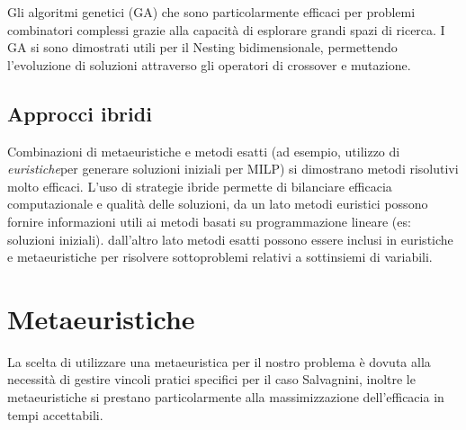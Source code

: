 Gli algoritmi genetici (GA) che sono particolarmente efficaci per problemi combinatori complessi grazie alla capacità di esplorare grandi spazi di ricerca. I GA si sono dimostrati utili per il Nesting bidimensionale, permettendo l'evoluzione di soluzioni attraverso gli operatori di crossover e mutazione.


\subsection{Approcci ibridi}

Combinazioni di metaeuristiche e metodi esatti (ad esempio, utilizzo di \emph{euristiche}\glsfirstoccur per generare soluzioni iniziali per MILP) si dimostrano metodi risolutivi molto efficaci. L'uso di strategie ibride permette di bilanciare efficacia computazionale e qualità delle soluzioni, da un lato metodi euristici possono fornire informazioni utili ai metodi basati su programmazione lineare (es: soluzioni iniziali). dall'altro lato metodi esatti possono essere inclusi in euristiche e metaeuristiche per risolvere sottoproblemi relativi a sottinsiemi di variabili. 

\section{Metaeuristiche}

La scelta di utilizzare una metaeuristica per il nostro problema è dovuta alla necessità di gestire vincoli pratici specifici per il caso Salvagnini, inoltre le metaeuristiche si prestano particolarmente alla massimizzazione dell'efficacia in tempi accettabili.

